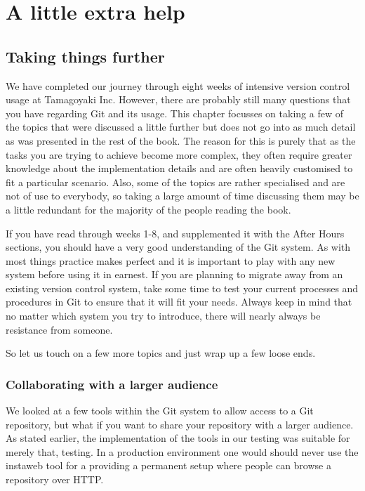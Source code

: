 \cleardoublepage
\chapter{A little extra help}
\section{Taking things further}

We have completed our journey through eight weeks of intensive version control usage at Tamagoyaki Inc.
However, there are probably still many questions that you have regarding Git and its usage.
This chapter focusses on taking a few of the topics that were discussed a little further but does not go into as much detail as was presented in the rest of the book.
The reason for this is purely that as the tasks you are trying to achieve become more complex, they often require greater knowledge about the implementation details
and are often heavily customised to fit a particular scenario.
Also, some of the topics are rather specialised and are not of use to everybody, so taking a large amount of time discussing them may be a little redundant for the majority of the people reading the book.

If you have read through weeks 1-8, and supplemented it with the After Hours sections, you should have a very good understanding of the Git system.
As with most things practice makes perfect and it is important to play with any new system before using it in earnest.
If you are planning to migrate away from an existing version control system, take some time to test your current processes and procedures in Git to ensure that it will fit your needs.
Always keep in mind that no matter which system you try to introduce, there will nearly always be resistance from someone.

So let us touch on a few more topics and just wrap up a few loose ends.

\subsection{Collaborating with a larger audience}
We looked at a few tools within the Git system to allow access to a Git repository, but what if you want to share your repository with a larger audience.
As stated earlier, the implementation of the tools in our testing was suitable for merely that, testing.
In a production environment one would should never use the instaweb tool for a providing a permanent setup where people can browse a repository over HTTP.

